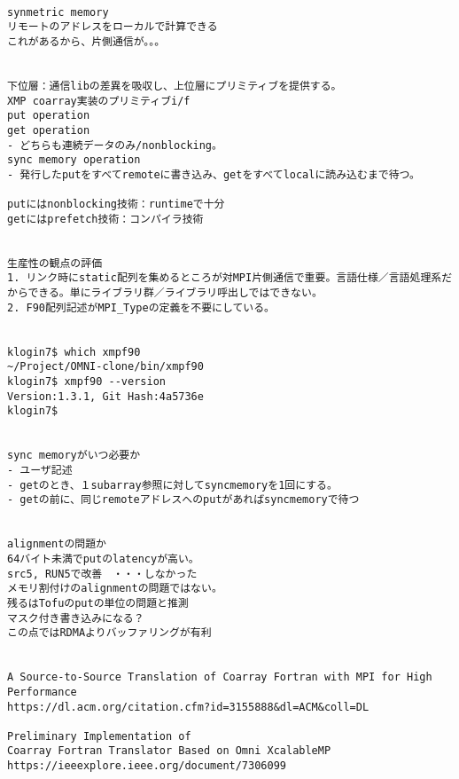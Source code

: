 \begin{verbatim}

synmetric memory
リモートのアドレスをローカルで計算できる
これがあるから、片側通信が。。。


下位層：通信libの差異を吸収し、上位層にプリミティブを提供する。
XMP coarray実装のプリミティブi/f
put operation
get operation
- どちらも連続データのみ/nonblocking。
sync memory operation
- 発行したputをすべてremoteに書き込み、getをすべてlocalに読み込むまで待つ。

putにはnonblocking技術：runtimeで十分
getにはprefetch技術：コンパイラ技術


生産性の観点の評価
1. リンク時にstatic配列を集めるところが対MPI片側通信で重要。言語仕様／言語処理系だからできる。単にライブラリ群／ライブラリ呼出しではできない。
2. F90配列記述がMPI_Typeの定義を不要にしている。


klogin7$ which xmpf90
~/Project/OMNI-clone/bin/xmpf90
klogin7$ xmpf90 --version
Version:1.3.1, Git Hash:4a5736e
klogin7$ 


sync memoryがいつ必要か
- ユーザ記述
- getのとき、１subarray参照に対してsyncmemoryを1回にする。
- getの前に、同じremoteアドレスへのputがあればsyncmemoryで待つ


alignmentの問題か
64バイト未満でputのlatencyが高い。
src5, RUN5で改善　・・・しなかった
メモリ割付けのalignmentの問題ではない。
残るはTofuのputの単位の問題と推測
マスク付き書き込みになる？
この点ではRDMAよりバッファリングが有利


A Source-to-Source Translation of Coarray Fortran with MPI for High Performance
https://dl.acm.org/citation.cfm?id=3155888&dl=ACM&coll=DL

Preliminary Implementation of
Coarray Fortran Translator Based on Omni XcalableMP
https://ieeexplore.ieee.org/document/7306099

\end{verbatim}
